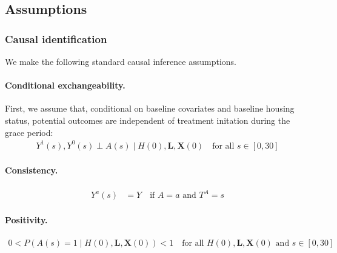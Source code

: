 %
%

\subsection{Assumptions}
\subsubsection{Causal identification}

We make the following standard causal inference assumptions.

\paragraph{Conditional exchangeability.}  First, we assume that, conditional on baseline covariates and baseline housing status, potential outcomes are independent of treatment initation during the grace period:
\begin{align*}
    Y^1(s), Y^0(s) \perp A(s) \mid H(0), \boldsymbol{L}, \boldsymbol{X}(0) \quad \text{for all } s \in [0, 30]
\end{align*}



\paragraph{Consistency.}
\begin{align*}
    Y^a(s) &= Y \quad \text{if } A=a \text{ and } T^A=s
\end{align*}

\paragraph{Positivity.}
\begin{align*}
    0 < P(A(s)=1 \mid H(0), \boldsymbol{L}, \boldsymbol{X}(0)) < 1 \quad \text{for all } H(0), \boldsymbol{L}, \boldsymbol{X}(0) \text{ and } s \in [0, 30]
\end{align*}


